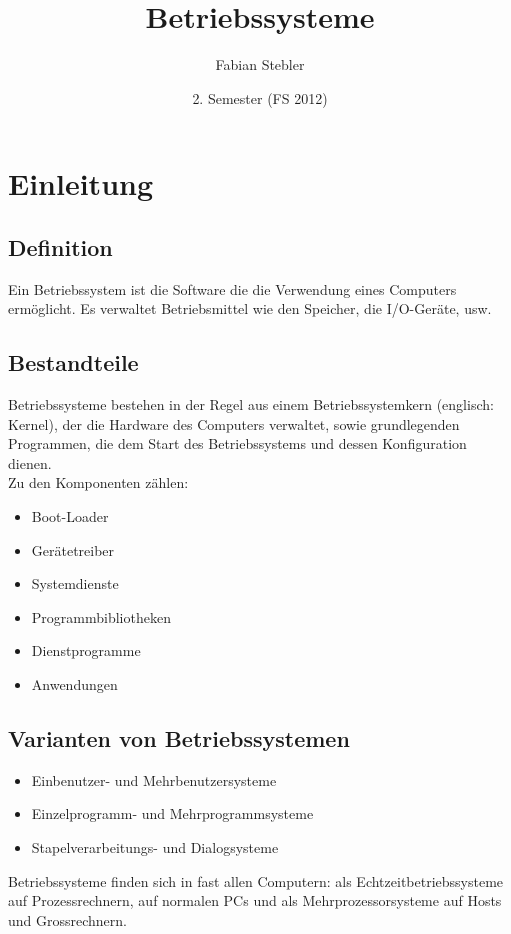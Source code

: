 \documentclass[a4paper, 10pt]{article}
\title{Betriebssysteme}
\author{Fabian Stebler}
\date{2. Semester (FS 2012)}
\begin{document}
\maketitle
\newpage
\section{Einleitung}
\subsection{Definition}
Ein Betriebssystem ist die Software die die Verwendung eines Computers ermöglicht. Es verwaltet Betriebsmittel wie den Speicher, die I/O-Geräte, usw.\\
\subsection{Bestandteile}
Betriebssysteme bestehen in der Regel aus einem Betriebssystemkern (englisch: Kernel), der die Hardware des Computers verwaltet, sowie grundlegenden Programmen, die dem Start des Betriebssystems und dessen Konfiguration dienen.\\
Zu den Komponenten zählen:
\begin{itemize}
\item Boot-Loader
\item Gerätetreiber
\item Systemdienste
\item Programmbibliotheken
\item Dienstprogramme
\item Anwendungen
\end{itemize}

\subsection{Varianten von Betriebssystemen}
\begin{itemize}
\item Einbenutzer- und Mehrbenutzersysteme
\item Einzelprogramm- und Mehrprogrammsysteme
\item Stapelverarbeitungs- und Dialogsysteme
\end{itemize}
Betriebssysteme finden sich in fast allen Computern: als Echtzeitbetriebssysteme auf Prozessrechnern, auf normalen PCs und als Mehrprozessorsysteme auf Hosts und Grossrechnern.
\end{document}
